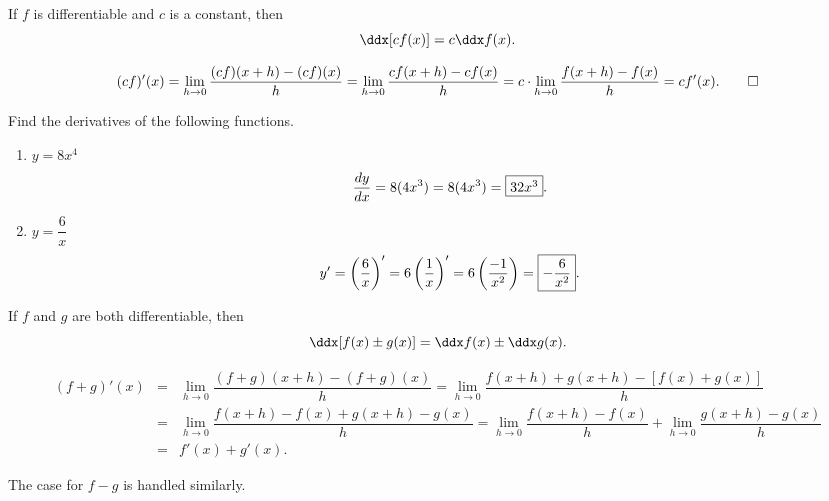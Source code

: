 \documentclass{book}
\begin{document}
\begin{Thm} If $f$ is differentiable and $c$ is a constant, then \[\ddx[cf(x)]  = c\ddx f(x).\] \end{Thm}
\begin{pf}\mbox{}\vspace{-25pt}

\[
(cf)'(x)  = \lim_{h\to 0} \dfrac{(cf)(x+h) - (cf)(x)}{h}  = \lim_{h\to 0} \dfrac{cf(x+h)  - cf(x)}{h} 
= c\cdot\lim_{h\to 0} \dfrac{f(x+h) - f(x)}{h} = cf'(x). \qedhere
\]
\end{pf}\vs

\begin{Exam} Find the derivatives of the following functions.
\begin{enumerate}
\item $y = 8x^4$
\[\dfrac{dy}{dx} = 8(4x^3) = 8(4x^3) = \fbox{$32x^3$}.\]

%
%

\item $y= \dfrac{6}{x}$
\[y' = \left(\dfrac{6}{x}\right)' = 6\left(\dfrac{1}{x}\right)' = 6\left(\dfrac{-1}{x^2}\right) = \fbox{$-\dfrac{6}{x^2}$}. \]
\end{enumerate}
\end{Exam}\vs

\begin{Thm} If $f$ and $g$ are both differentiable, then \[\ddx[f(x) \pm g(x)]  = \ddx f(x) \pm \ddx g(x).\] \end{Thm}
\begin{pf}\mbox{}\vspace{-25pt}

\begin{eqnarray*}
(f+ g)'(x)  &=& \lim_{h\to 0} \dfrac{(f+ g)(x+h) - (f+ g)(x)}{h}  = \lim_{h\to 0} \dfrac{f(x+h)  + g(x+h) - [f(x) + g(x)]}{h} \\
&=& \lim_{h\to 0} \dfrac{f(x+h)  - f(x) + g(x+h) - g(x)}{h}  = \lim_{h\to 0} \dfrac{f(x+h)  - f(x)}{h} + \lim_{h\to 0}\dfrac{ g(x+h) - g(x)}{h} \\
&=& f'(x) + g'(x).
\end{eqnarray*}

The case for $f-g$ is handled similarly.
\end{pf}\vs
\end{document}
